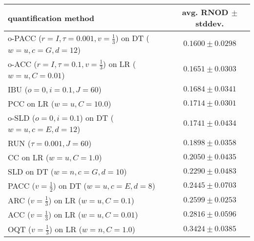 \begin{tabular}{lc}
  \toprule
  quantification method & avg. RNOD $\pm$ stddev. \\
  \midrule
  o-PACC ($r=I, \tau=0.001, v=\frac{1}{3}$) on DT ($w=u, c=G, d=12$) & $\mathbf{0.1600 \pm 0.0298}$ \\
  o-ACC ($r=I, \tau=0.1, v=\frac{1}{3}$) on LR ($w=u, C=0.01$) & $0.1651 \pm 0.0303$ \\
  IBU ($o=0, i=0.1, J=60$) & $0.1684 \pm 0.0341$ \\
  PCC on LR ($w=u, C=10.0$) & $0.1714 \pm 0.0301$ \\
  o-SLD ($o=0, i=0.1$) on DT ($w=u, c=E, d=12$) & $0.1741 \pm 0.0434$ \\
  RUN ($\tau=0.001, J=60$) & $0.1898 \pm 0.0358$ \\
  CC on LR ($w=u, C=1.0$) & $0.2050 \pm 0.0435$ \\
  SLD on DT ($w=n, c=G, d=10$) & $0.2290 \pm 0.0483$ \\
  PACC ($v=\frac{1}{2}$) on DT ($w=u, c=E, d=8$) & $0.2445 \pm 0.0703$ \\
  ARC ($v=\frac{1}{3}$) on LR ($w=u, C=0.1$) & $0.2599 \pm 0.0253$ \\
  ACC ($v=\frac{1}{3}$) on LR ($w=u, C=0.01$) & $0.2816 \pm 0.0596$ \\
  OQT ($v=\frac{1}{3}$) on LR ($w=n, C=1.0$) & $0.3424 \pm 0.0385$ \\
  \bottomrule
\end{tabular}
